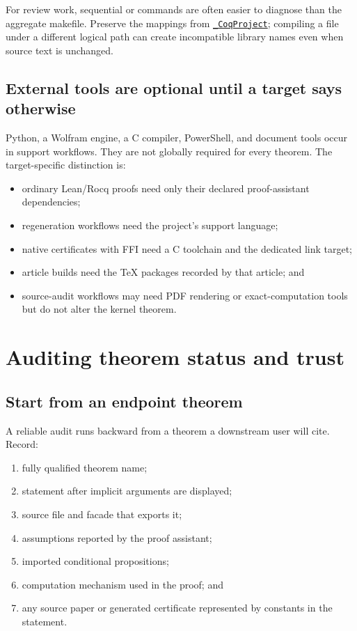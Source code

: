 \documentclass[
  10pt,
  a4paper,
  twoside,
  open=any,
  parskip=half,
  headings=big
]{scrreprt}
\newcommand{\CommitFull}{56a402bf82a9aab119fcbe3e96b991d387b221c5}
\newcommand{\RepoWeb}{https://github.com/VladimirReshetnikov/ProveIt}
\newcommand{\RepoBlobBase}{\RepoWeb/blob/\CommitFull}
\newcommand{\code}[1]{\texttt{\detokenize{#1}}}
\newcommand{\RepoFile}[1]{\href{\RepoBlobBase/#1}{\nolinkurl{#1}}}
\begin{document}
For review work, sequential \code{rocq compile} or \code{coqc} commands are often easier to diagnose than the aggregate makefile. Preserve the \code{-Q} mappings from \RepoFile{_CoqProject}; compiling a file under a different logical path can create incompatible library names even when source text is unchanged.

\section{External tools are optional until a target says otherwise}

Python, a Wolfram engine, a C compiler, PowerShell, and document tools occur in support workflows. They are not globally required for every theorem. The target-specific distinction is:

\begin{itemize}
  \item ordinary Lean/Rocq proofs need only their declared proof-assistant dependencies;
  \item regeneration workflows need the project's support language;
  \item native certificates with FFI need a C toolchain and the dedicated link target;
  \item article builds need the TeX packages recorded by that article; and
  \item source-audit workflows may need PDF rendering or exact-computation tools but do not alter the kernel theorem.
\end{itemize}

\chapter{Auditing theorem status and trust}
\label{ch:auditing}

\section{Start from an endpoint theorem}

A reliable audit runs backward from a theorem a downstream user will cite. Record:

\begin{enumerate}
  \item fully qualified theorem name;
  \item statement after implicit arguments are displayed;
  \item source file and facade that exports it;
  \item assumptions reported by the proof assistant;
  \item imported conditional propositions;
  \item computation mechanism used in the proof; and
  \item any source paper or generated certificate represented by constants in the statement.
\end{enumerate}
\end{document}
